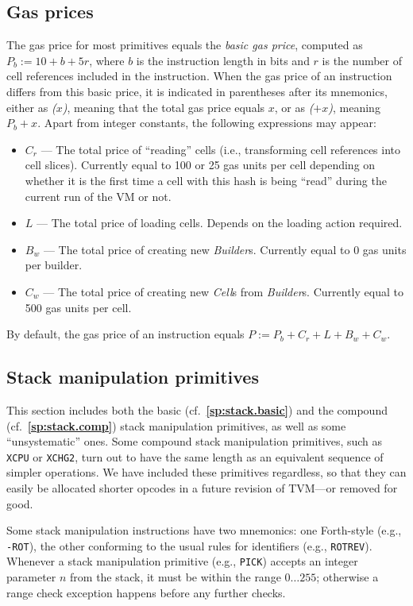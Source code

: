 \documentclass[12pt,oneside]{article}
\def\refpoint#1{{\rm\textbf{\ref{#1}}}}
\let\ptref=\refpoint
\def\mysubsection#1{

    \subsection{#1}\fancyhead[C]{\small{\textsc{\textrm{\thesubsection.} #1}}}}
\begin{document}
\mysubsection{Gas prices}
\def\gas#1{{\em ($#1$)}}
The gas price for most primitives equals the {\em basic gas price}, computed as $P_b:=10+b+5r$, where $b$ is the instruction length in bits and $r$ is the number of cell references included in the instruction. When the gas price of an instruction differs from this basic price, it is indicated in parentheses after its mnemonics, either as \gas{x}, meaning that the total gas price equals $x$, or as \gas{+x}, meaning $P_b+x$. Apart from integer constants, the following expressions may appear:
\begin{itemize}
\item $C_r$ --- The total price of ``reading'' cells (i.e., transforming cell references into cell slices). Currently equal to 100 or 25 gas units per cell depending on whether it is the first time a cell with this hash is being ``read'' during the current run of the VM or not.
\item $L$ --- The total price of loading cells. Depends on the loading action required.
\item $B_w$ --- The total price of creating new {\em Builder\/}s. Currently equal to 0 gas units per builder.
\item $C_w$ --- The total price of creating new {\em Cell\/}s from {\em Builder\/}s. Currently equal to 500 gas units per cell.
\end{itemize}
By default, the gas price of an instruction equals $P:=P_b+C_r+L+B_w+C_w$.

\mysubsection{Stack manipulation primitives}

This section includes both the basic (cf.~\ptref{sp:stack.basic}) and the compound (cf.~\ptref{sp:stack.comp}) stack manipulation primitives, as well as some ``unsystematic'' ones. Some compound stack manipulation primitives, such as {\tt XCPU} or {\tt XCHG2}, turn out to have the same length as an equivalent sequence of simpler operations. We have included these primitives regardless, so that they can easily be allocated shorter opcodes in a future revision of TVM---or removed for good.

Some stack manipulation instructions have two mnemonics: one Forth-style (e.g., {\tt -ROT}), the other conforming to the usual rules for identifiers (e.g., {\tt ROTREV}). Whenever a stack manipulation primitive (e.g., {\tt PICK}) accepts an integer parameter $n$ from the stack, it must be within the range $0\dots255$; otherwise a range check exception happens before any further checks.
\end{document}
